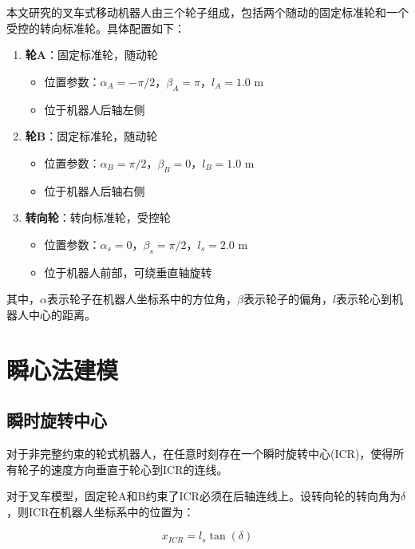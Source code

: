 \documentclass[12pt,a4paper]{report}
\begin{document}
本文研究的叉车式移动机器人由三个轮子组成，包括两个随动的固定标准轮和一个受控的转向标准轮。具体配置如下：

\begin{enumerate}[itemsep=0pt]
    \item \textbf{轮A}：固定标准轮，随动轮
    \begin{itemize}[itemsep=0pt]
        \item 位置参数：$\alpha_A = -\pi/2$，$\beta_A = \pi$，$l_A = 1.0$ m
        \item 位于机器人后轴左侧
    \end{itemize}
    
    \item \textbf{轮B}：固定标准轮，随动轮
    \begin{itemize}[itemsep=0pt]
        \item 位置参数：$\alpha_B = \pi/2$，$\beta_B = 0$，$l_B = 1.0$ m
        \item 位于机器人后轴右侧
    \end{itemize}
    
    \item \textbf{转向轮}：转向标准轮，受控轮
    \begin{itemize}[itemsep=0pt]
        \item 位置参数：$\alpha_s = 0$，$\beta_s = \pi/2$，$l_s = 2.0$ m
        \item 位于机器人前部，可绕垂直轴旋转
    \end{itemize}
\end{enumerate}

其中，$\alpha$表示轮子在机器人坐标系中的方位角，$\beta$表示轮子的偏角，$l$表示轮心到机器人中心的距离。

\section{瞬心法建模}

\subsection{瞬时旋转中心}

对于非完整约束的轮式机器人，在任意时刻存在一个瞬时旋转中心(ICR)，使得所有轮子的速度方向垂直于轮心到ICR的连线。

对于叉车模型，固定轮A和B约束了ICR必须在后轴连线上。设转向轮的转向角为$\delta$，则ICR在机器人坐标系中的位置为：

\begin{equation}
x_{ICR} = l_s \tan(\delta)
\end{equation}
\end{document}
